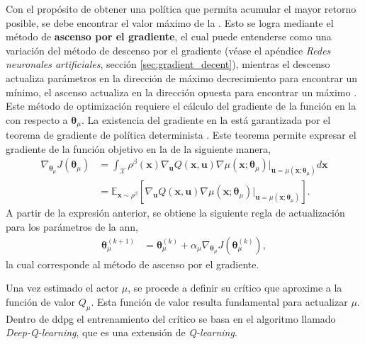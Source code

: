 Con el propósito de obtener una política que permita acumular el mayor retorno posible, se debe encontrar el valor máximo de la . Esto se logra mediante el método de \textbf{ascenso por el gradiente}, el cual puede entenderse como una variación del método de descenso por el gradiente (véase el apéndice \textit{Redes neuronales artificiales}, sección \ref{sec:gradient_decent}), mientras el descenso actualiza parámetros en la dirección de máximo decrecimiento para encontrar un mínimo, el ascenso actualiza en la dirección opuesta para encontrar un máximo \cite{lillicrap2015continuous}. Este método de optimización requiere el cálculo del gradiente de la función en la  con respecto a $\bm{\theta}_{\mu}$. La existencia del gradiente en la  está garantizada por el teorema de gradiente de política determinista \cite{silver14}. Este teorema permite expresar el gradiente de la función objetivo en la  de la siguiente manera, 
\begin{equation}
    \begin{aligned}       
\nabla_{\bm\theta_{\mu}}J(\bm\theta_{\mu}) &= \int_{\mathcal{X}} \rho^{\beta}(\mathbf{x}) \nabla_{\mathbf{u}}Q(\mathbf{x}, \mathbf{u})\nabla \mu(\mathbf{x};\bm\theta_{\mu})\big|_{\mathbf{u}=\mu(\mathbf{x};\bm\theta_{\mu})}d\mathbf{x} \\
        &= \mathbb{E}_{\mathbf{x}\sim \rho^{\beta}} 
        \left[
        \nabla_{\mathbf{u}}Q(\mathbf{x}, \mathbf{u})\nabla \mu(\mathbf{x};\bm\theta_{\mu})\big|_{\mathbf{u}=\mu(\mathbf{x};\bm\theta_{\mu})}
        \right].
\end{aligned}
\end{equation}
A partir de la expresión anterior, se obtiene la siguiente regla de actualización para los parámetros de la \acrshort{ann},
    \begin{align}
        \bm\theta^{(k+1)}_{\mu} &= \bm\theta^{(k)}_{\mu} + \alpha_{\mu} \nabla_{\bm\theta_{\mu}}J\left(\bm\theta_{\mu}^{(k)}\right), \label{eq:update_policy_gradient}
    \end{align}
la cual corresponde al método de ascenso por el gradiente. 

Una vez estimado el actor $\mu$, se procede a definir su crítico que aproxime a la función de valor $Q_{\mu}$. Esta función de valor resulta fundamental para actualizar $\mu$. Dentro de \acrshort{ddpg} el entrenamiento del crítico se basa en el algoritmo llamado \textit{Deep-Q-learning}, que es una extensión de \textit{Q-learning}.

